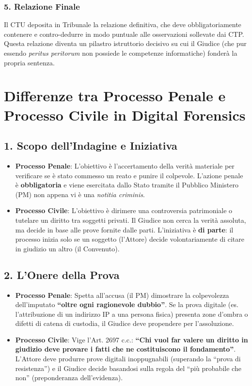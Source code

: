 \documentclass[11pt,a4paper]{article}
\begin{document}
\subsubsection{5. Relazione Finale}
Il CTU deposita in Tribunale la relazione definitiva, che deve obbligatoriamente contenere e contro-dedurre in modo puntuale alle osservazioni sollevate dai CTP. Questa relazione diventa un pilastro istruttorio decisivo su cui il Giudice (che pur essendo \textit{peritus peritorum} non possiede le competenze informatiche) fonderà la propria sentenza.


\section{Differenze tra Processo Penale e Processo Civile in Digital Forensics}
\subsection{1. Scopo dell'Indagine e Iniziativa}
\begin{itemize}
    \item \textbf{Processo Penale}: L'obiettivo è l'accertamento della verità materiale per verificare se è stato commesso un reato e punire il colpevole. L'azione penale è \textbf{obbligatoria} e viene esercitata dallo Stato tramite il Pubblico Ministero (PM) non appena vi è una \textit{notitia criminis}.
    \item \textbf{Processo Civile}: L'obiettivo è dirimere una controversia patrimoniale o tutelare un diritto tra soggetti privati. Il Giudice non cerca la verità assoluta, ma decide in base alle prove fornite dalle parti. L'iniziativa è \textbf{di parte}: il processo inizia solo se un soggetto (l'Attore) decide volontariamente di citare in giudizio un altro (il Convenuto).
\end{itemize}

\subsection{2. L'Onere della Prova}
\begin{itemize}
    \item \textbf{Processo Penale}: Spetta all'accusa (il PM) dimostrare la colpevolezza dell'imputato \textbf{``oltre ogni ragionevole dubbio''}. Se la prova digitale (es. l'attribuzione di un indirizzo IP a una persona fisica) presenta zone d'ombra o difetti di catena di custodia, il Giudice deve propendere per l'assoluzione.
    \item \textbf{Processo Civile}: Vige l'Art. 2697 c.c.: \textbf{``Chi vuol far valere un diritto in giudizio deve provare i fatti che ne costituiscono il fondamento''}. L'Attore deve produrre prove digitali inoppugnabili (superando la ``prova di resistenza'') e il Giudice decide basandosi sulla regola del ``più probabile che non'' (preponderanza dell'evidenza).
\end{itemize}
\end{document}
